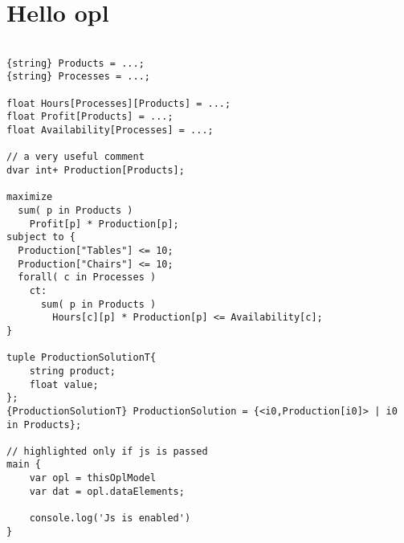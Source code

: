 \documentclass{article}
\begin{document}
	
	\section*{Hello opl}
	
	\begin{lstlisting}
	 
{string} Products = ...;
{string} Processes = ...;

float Hours[Processes][Products] = ...;
float Profit[Products] = ...;
float Availability[Processes] = ...;

// a very useful comment
dvar int+ Production[Products];
 
maximize
  sum( p in Products ) 
    Profit[p] * Production[p];
subject to {
  Production["Tables"] <= 10;
  Production["Chairs"] <= 10;
  forall( c in Processes )
    ct:
      sum( p in Products ) 
        Hours[c][p] * Production[p] <= Availability[c];
}

tuple ProductionSolutionT{ 
	string product; 
	float value; 
};
{ProductionSolutionT} ProductionSolution = {<i0,Production[i0]> | i0 in Products};

// highlighted only if js is passed
main {
	var opl = thisOplModel
	var dat = opl.dataElements;

	console.log('Js is enabled')
}
	\end{lstlisting}	
\end{document}
